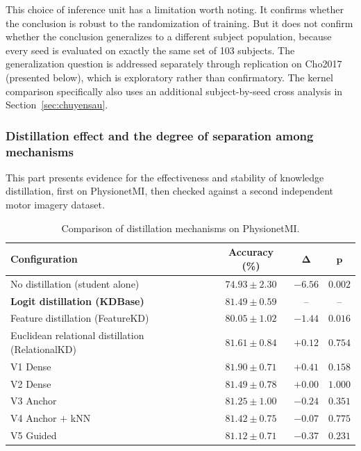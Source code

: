 This choice of inference unit has a limitation worth noting. It
confirms whether the conclusion is robust to the randomization of
training. But it does not confirm whether the conclusion generalizes
to a different subject population, because every seed is evaluated
on exactly the same set of 103 subjects. The generalization question
is addressed separately through replication on Cho2017 (presented
below), which is exploratory rather than confirmatory. The kernel
comparison specifically also uses an additional subject-by-seed
cross analysis in Section~\ref{sec:chuyensau}.

\subsubsection{Distillation effect and the degree of separation among mechanisms}
\label{sec:hieuqua}

This part presents evidence for the effectiveness and stability of
knowledge distillation, first on PhysionetMI, then checked against a
second independent motor imagery dataset.

\begin{table}[!htbp]
\centering
\caption{Comparison of distillation mechanisms on PhysionetMI.}
\label{tab:tongthe}
\begin{tabular}{lccc}
\toprule
\textbf{Configuration} & \textbf{Accuracy (\%)} & $\boldsymbol{\Delta}$ & $\boldsymbol{p}$ \\
\midrule
No distillation (student alone) & $74.93 \pm 2.30$ & $-6.56$ & $0.002$ \\
\textbf{Logit distillation (KDBase)} & $81.49 \pm 0.59$ & -- & -- \\
Feature distillation (FeatureKD) & $80.05 \pm 1.02$ & $-1.44$ & $0.016$ \\
Euclidean relational distillation (RelationalKD) & $81.61 \pm 0.84$ & $+0.12$ & $0.754$ \\
V1 Dense & $81.90 \pm 0.71$ & $+0.41$ & $0.158$ \\
V2 Dense & $81.49 \pm 0.78$ & $+0.00$ & $1.000$ \\
V3 Anchor & $81.25 \pm 1.00$ & $-0.24$ & $0.351$ \\
V4 Anchor $+$ kNN & $81.42 \pm 0.75$ & $-0.07$ & $0.775$ \\
V5 Guided & $81.12 \pm 0.71$ & $-0.37$ & $0.231$ \\
\bottomrule
\end{tabular}
\end{table}
\FloatBarrier

